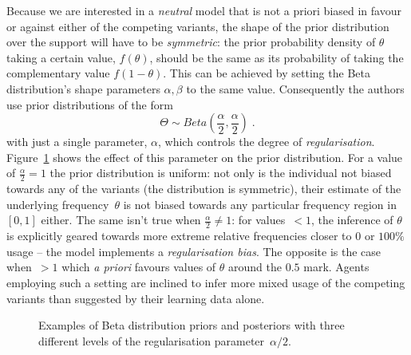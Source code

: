 Because we are interested in a \emph{neutral} model that is not a priori biased in favour or against either of the competing variants, the shape of the prior distribution over the support will have to be \emph{symmetric}: the prior probability density of $\theta$ taking a certain value, $f(\theta)$, should be the same as its probability of taking the complementary value $f(1-\theta)$. This can be achieved by setting the Beta distribution's shape parameters $\alpha,\beta$ to the same value. Consequently the authors use prior distributions of the form
\begin{equation}
\Theta \sim Beta(\frac{\alpha}{2},\frac{\alpha}{2})\;.
\end{equation}
with just a single parameter, $\alpha$, which controls the degree of \emph{regularisation}. Figure~\ref{fig:priors} shows the effect of this parameter on the prior distribution. For a value of $\frac{\alpha}{2}=1$ the prior distribution is uniform: not only is the individual not biased towards any of the variants (the distribution is symmetric), their estimate of the underlying frequency~$\theta$ is not biased towards any particular frequency region in~$[0,1]$ either. The same isn't true when $\frac{\alpha}{2}\ne 1$: for values~$<1$, the inference of $\theta$ is explicitly geared towards more extreme relative frequencies closer to $0$ or $100\%$ usage -- the model implements a \emph{regularisation bias}. The opposite is the case when~$>1$ which \emph{a priori} favours values of $\theta$ around the $0.5$ mark. Agents employing such a setting are inclined to infer more mixed usage of the competing variants than suggested by their learning data alone.



\begin{figure}[htbp]

{\centering {}

}

\caption[Examples of Beta distribution priors and posteriors with three different levels of the regularisation parameter~]{Examples of Beta distribution priors and posteriors with three different levels of the regularisation parameter~$\alpha/2$.}\label{fig:priors}
\end{figure}



